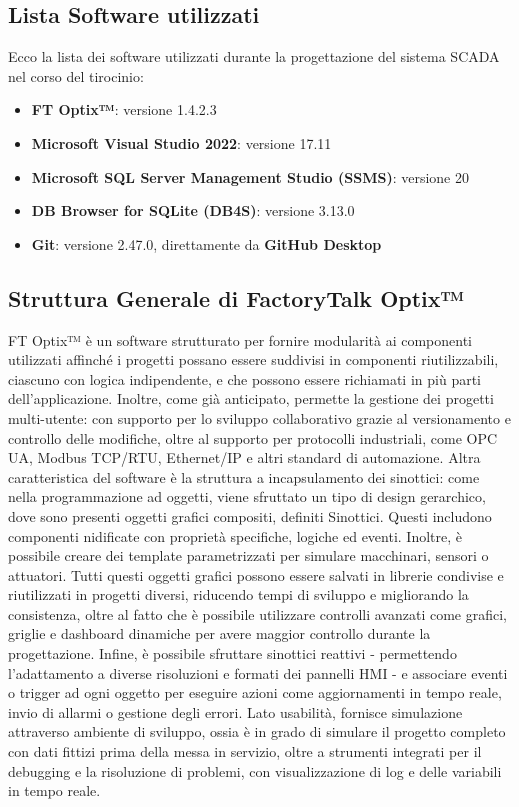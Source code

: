 \subsection{Lista Software utilizzati}
Ecco la lista dei software utilizzati durante la progettazione del sistema SCADA nel corso del tirocinio:
\begin{itemize}
    \item \textbf{FT Optix™}: versione 1.4.2.3
    \item \textbf{Microsoft Visual Studio 2022}: versione 17.11
    \item \textbf{Microsoft SQL Server Management Studio (SSMS)}: versione 20
    \item \textbf{DB Browser for SQLite (DB4S)}: versione 3.13.0
    \item \textbf{Git}: versione 2.47.0, direttamente da \textbf{GitHub Desktop}
\end{itemize}

\subsection{Struttura Generale di FactoryTalk Optix™}
FT Optix™ è un software strutturato per fornire modularità ai componenti utilizzati affinché i progetti possano essere suddivisi in componenti riutilizzabili, ciascuno con logica indipendente, e che possono essere richiamati in più parti dell'applicazione. Inoltre, come già anticipato, permette la gestione dei progetti multi-utente: con supporto per lo sviluppo collaborativo grazie al versionamento e controllo delle modifiche, oltre al supporto per protocolli industriali, come OPC UA, Modbus TCP/RTU, Ethernet/IP e altri standard di automazione. Altra caratteristica del software è la struttura a incapsulamento dei sinottici: come nella programmazione ad oggetti, viene sfruttato un tipo di design gerarchico, dove sono presenti oggetti grafici compositi, definiti Sinottici. Questi includono componenti nidificate con proprietà specifiche, logiche ed eventi. Inoltre, è possibile creare dei template parametrizzati per simulare macchinari, sensori o attuatori. Tutti questi oggetti grafici possono essere salvati in librerie condivise e riutilizzati in progetti diversi, riducendo tempi di sviluppo e migliorando la consistenza, oltre al fatto che è possibile utilizzare controlli avanzati come grafici, griglie e dashboard dinamiche per avere maggior controllo durante la progettazione. Infine, è possibile sfruttare sinottici reattivi - permettendo l'adattamento a diverse risoluzioni e formati dei pannelli HMI - e associare eventi o trigger ad ogni oggetto per eseguire azioni come aggiornamenti in tempo reale, invio di allarmi o gestione degli errori. Lato usabilità, fornisce simulazione attraverso ambiente di sviluppo, ossia è in grado di simulare il progetto completo con dati fittizi prima della messa in servizio, oltre a strumenti integrati per il debugging e la risoluzione di problemi, con visualizzazione di log e delle variabili in tempo reale.

